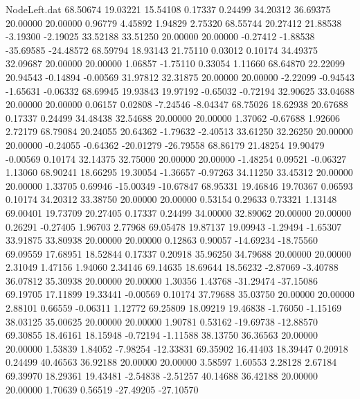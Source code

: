 \begin{filecontents}{NodeLeft.dat}
  68.50674   19.03221   15.54108     0.17337    0.24499   34.20312   36.69375   20.00000   20.00000    0.96779    4.45892    1.94829    2.75320
  68.55744   20.27412   21.88538    -3.19300   -2.19025   33.52188   33.51250   20.00000   20.00000   -0.27412   -1.88538  -35.69585  -24.48572
  68.59794   18.93143   21.75110     0.03012    0.10174   34.49375   32.09687   20.00000   20.00000    1.06857   -1.75110    0.33054    1.11660
  68.64870   22.22099   20.94543    -0.14894   -0.00569   31.97812   32.31875   20.00000   20.00000   -2.22099   -0.94543   -1.65631   -0.06332
  68.69945   19.93843   19.97192    -0.65032   -0.72194   32.90625   33.04688   20.00000   20.00000    0.06157    0.02808   -7.24546   -8.04347
  68.75026   18.62938   20.67688     0.17337    0.24499   34.48438   32.54688   20.00000   20.00000    1.37062   -0.67688    1.92606    2.72179
  68.79084   20.24055   20.64362    -1.79632   -2.40513   33.61250   32.26250   20.00000   20.00000   -0.24055   -0.64362  -20.01279  -26.79558
  68.86179   21.48254   19.90479    -0.00569    0.10174   32.14375   32.75000   20.00000   20.00000   -1.48254    0.09521   -0.06327    1.13060
  68.90241   18.66295   19.30054    -1.36657   -0.97263   34.11250   33.45312   20.00000   20.00000    1.33705    0.69946  -15.00349  -10.67847
  68.95331   19.46846   19.70367     0.06593    0.10174   34.20312   33.38750   20.00000   20.00000    0.53154    0.29633    0.73321    1.13148
  69.00401   19.73709   20.27405     0.17337    0.24499   34.00000   32.89062   20.00000   20.00000    0.26291   -0.27405    1.96703    2.77968
  69.05478   19.87137   19.09943    -1.29494   -1.65307   33.91875   33.80938   20.00000   20.00000    0.12863    0.90057  -14.69234  -18.75560
  69.09559   17.68951   18.52844     0.17337    0.20918   35.96250   34.79688   20.00000   20.00000    2.31049    1.47156    1.94060    2.34146
  69.14635   18.69644   18.56232    -2.87069   -3.40788   36.07812   35.30938   20.00000   20.00000    1.30356    1.43768  -31.29474  -37.15086
  69.19705   17.11899   19.33441    -0.00569    0.10174   37.79688   35.03750   20.00000   20.00000    2.88101    0.66559   -0.06311    1.12772
  69.25809   18.09219   19.46838    -1.76050   -1.15169   38.03125   35.00625   20.00000   20.00000    1.90781    0.53162  -19.69738  -12.88570
  69.30855   18.46161   18.15948    -0.72194   -1.11588   38.13750   36.36563   20.00000   20.00000    1.53839    1.84052   -7.98254  -12.33831
  69.35902   16.41403   18.39447     0.20918    0.24499   40.46563   36.92188   20.00000   20.00000    3.58597    1.60553    2.28128    2.67184
  69.39970   18.29361   19.43481    -2.54838   -2.51257   40.14688   36.42188   20.00000   20.00000    1.70639    0.56519  -27.49205  -27.10570

\end{filecontents}

